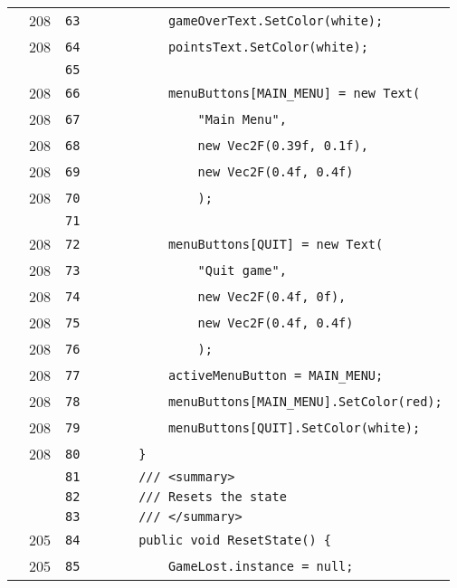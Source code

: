 \documentclass[a4paper,landscape,10pt]{article}
\begin{document}
\begin{longtable}[l]{lrrll}
\cellcolor{green} & 208 & \verb~63~ & & \verb~        gameOverText.SetColor(white);~\\
\cellcolor{green} & 208 & \verb~64~ & & \verb~        pointsText.SetColor(white);~\\
\cellcolor{gray} &  & \verb~65~ & & \verb~~\\
\cellcolor{green} & 208 & \verb~66~ & & \verb~        menuButtons[MAIN_MENU] = new Text(~\\
\cellcolor{green} & 208 & \verb~67~ & & \verb~            "Main Menu",~\\
\cellcolor{green} & 208 & \verb~68~ & & \verb~            new Vec2F(0.39f, 0.1f),~\\
\cellcolor{green} & 208 & \verb~69~ & & \verb~            new Vec2F(0.4f, 0.4f)~\\
\cellcolor{green} & 208 & \verb~70~ & & \verb~            );~\\
\cellcolor{gray} &  & \verb~71~ & & \verb~~\\
\cellcolor{green} & 208 & \verb~72~ & & \verb~        menuButtons[QUIT] = new Text(~\\
\cellcolor{green} & 208 & \verb~73~ & & \verb~            "Quit game",~\\
\cellcolor{green} & 208 & \verb~74~ & & \verb~            new Vec2F(0.4f, 0f),~\\
\cellcolor{green} & 208 & \verb~75~ & & \verb~            new Vec2F(0.4f, 0.4f)~\\
\cellcolor{green} & 208 & \verb~76~ & & \verb~            );~\\
\cellcolor{green} & 208 & \verb~77~ & & \verb~        activeMenuButton = MAIN_MENU;~\\
\cellcolor{green} & 208 & \verb~78~ & & \verb~        menuButtons[MAIN_MENU].SetColor(red);~\\
\cellcolor{green} & 208 & \verb~79~ & & \verb~        menuButtons[QUIT].SetColor(white);~\\
\cellcolor{green} & 208 & \verb~80~ & & \verb~    }~\\
\cellcolor{gray} &  & \verb~81~ & & \verb~    /// <summary>~\\
\cellcolor{gray} &  & \verb~82~ & & \verb~    /// Resets the state~\\
\cellcolor{gray} &  & \verb~83~ & & \verb~    /// </summary>~\\
\cellcolor{green} & 205 & \verb~84~ & & \verb~    public void ResetState() {~\\
\cellcolor{green} & 205 & \verb~85~ & & \verb~        GameLost.instance = null;~\\

\end{longtable}
\end{document}
